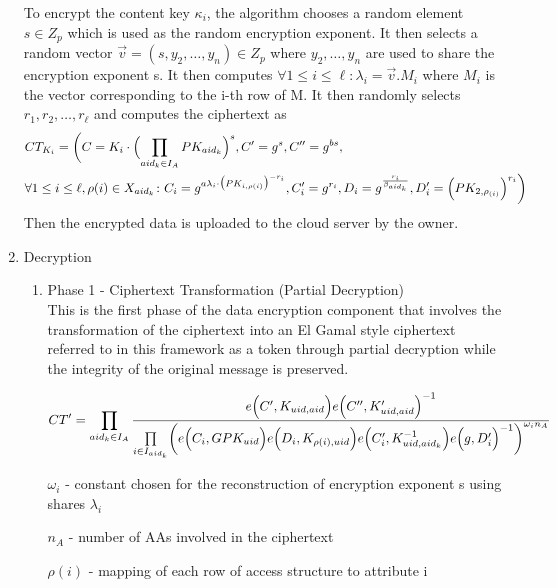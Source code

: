 \begin{enumerate}
	To encrypt the content key $\kappa_{i}$, the algorithm chooses a random element $ s \in Z_{p} $ which is used as the random encryption exponent. It then selects a random vector $ \vec{v} = (s, y_{2},\ldots,y_{n}) \in Z_{p} $ where $ y_{2},\ldots,y_{n} $ are used to share the encryption exponent s. It then computes $ \forall 1 \leq i \leq \ell: \lambda_{i} = \vec{v}.M_{i} $ where $ M_{i} $ is the vector corresponding to the i-th row of M. It then randomly selects $ r_{1},r_{2},\ldots,r_{\ell} $ and computes the ciphertext as	
	\begin{align*}
		&CT_{K_{i}} = \biggl(C = K_{i}\cdot\Bigl(\prod\limits_{aid_{k} \in I_{A}}PK_{aid_{k}}\Bigl)^{s}, C' = g^{s}, C'' = g^{bs},\\
		&\forall 1 \leq i \leq \ell, \rho(i) \in X_{aid_{k}} \colon C_{i} = g^{a\lambda_{i}\cdot\bigl(PK_{i,\rho(i)}\bigl)^{-r_{i}}}, C'_{i} = g^{r_{i}},D_{i} = g^{\frac{r_{i}}{\beta_{aid_k}}}, D'_{i} = \Bigl(PK_{2,\rho_{(i)}}\Bigl)^{r_{i}}\biggl)
	\end{align*}
	Then the encrypted data is uploaded to the cloud server by the owner.
	
	\item Decryption 
	
	\begin{enumerate}
		
		\item Phase 1 - Ciphertext Transformation (Partial Decryption)\\
		This is the first phase of the data encryption component that involves the transformation of the ciphertext into an El Gamal style ciphertext referred to in this framework as a token through partial decryption while the integrity of the original message is preserved.
		
		\begin{align*}
			CT' = \prod\limits_{aid_{k} \in I_{A}} \frac{e\Bigl(C', K_{uid,aid}\Bigl)e\Bigl(C'', K'_{uid,aid}\Bigl)^{-1}}{\prod\limits_{i \in I_{aid_k}}\biggl(e\Bigl(C_i, GPK_{uid}\Bigl)e\Bigl(D_i, K_{\rho(i),uid}\Bigl)e\Bigl(C'_i, K_{uid,aid_k}^{-1}\Bigl)e\Bigl(g, D'_i\Bigl)^{-1}\biggl)^{\omega_{i}n_A}}
		\end{align*}
		
		$\omega_{i}$ - constant chosen for the reconstruction of encryption exponent s using shares $\lambda_{i}$
		
		$n_A$ - number of AAs involved in the ciphertext
		
		$\rho(i)$ - mapping of each row of access structure to attribute i
		

\end{enumerate}
\end{enumerate}
